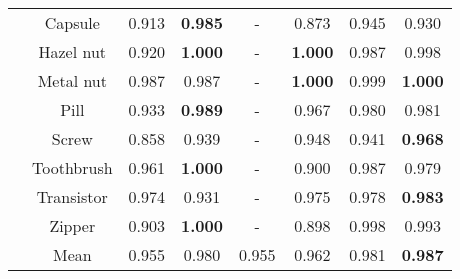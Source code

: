 \documentclass[letterpaper, 10 pt, conference]{ieeeconf}
\begin{document}
\begin{table*}
\begin{center}
{\begin{tabular}{cccccccc}
                          & Capsule    & 0.913          & \textbf{0.985} & -     & 0.873                                                                 & 0.945                                                                & 0.930          \\
                          & Hazel nut  & 0.920          & \textbf{1.000} & -     & \textbf{1.000}                                                        & 0.987                                                                & 0.998          \\
                          & Metal nut  & 0.987          & 0.987          & -     & \textbf{1.000}                                                        & 0.999                                                                & \textbf{1.000} \\
                          & Pill       & 0.933          & \textbf{0.989} & -     & 0.967                                                                 & 0.980                                                                & 0.981          \\
                          & Screw      & 0.858          & 0.939          & -     & 0.948                                                                 & 0.941                                                                & \textbf{0.968} \\
                          & Toothbrush & 0.961          & \textbf{1.000} & -     & 0.900                                                                 & 0.987                                                                & 0.979          \\
                          & Transistor & 0.974          & 0.931          & -     & 0.975                                                                 & 0.978                                                                & \textbf{0.983} \\
                          & Zipper     & 0.903          & \textbf{1.000} & -     & 0.898                                                                 & 0.998                                                                & 0.993          \\ \hline
\multicolumn{1}{l}{}      & Mean       & 0.955          & 0.980          & 0.955 & 0.962                                                                 & 0.981                                                                & \textbf{0.987} \\ \hline
\end{tabular}
}
\end{center}
\end{table*}
\end{document}
